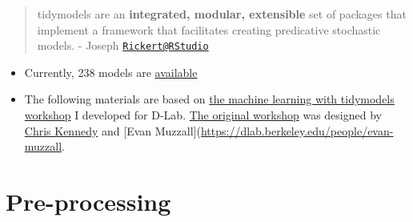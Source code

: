 \documentclass[
]{book}
\begin{document}
\begin{quote}
tidymodels are an \textbf{integrated, modular, extensible} set of packages that implement a framework that facilitates creating predicative stochastic models. - Joseph \href{mailto:Rickert@RStudio}{\nolinkurl{Rickert@RStudio}}
\end{quote}

\begin{itemize}
\item
  Currently, 238 models are \href{https://topepo.github.io/caret/available-models.html}{available}
\item
  The following materials are based on \href{https://github.com/dlab-berkeley/Machine-Learning-with-tidymodels}{the machine learning with tidymodels workshop} I developed for D-Lab. \href{https://github.com/dlab-berkeley/Machine-Learning-in-R}{The original workshop} was designed by \href{https://ck37.com/}{Chris Kennedy} and {[}Evan Muzzall{]}(\url{https://dlab.berkeley.edu/people/evan-muzzall}.
\end{itemize}

\hypertarget{pre-processing}{%
\section{Pre-processing}\label{pre-processing}}
\end{document}
